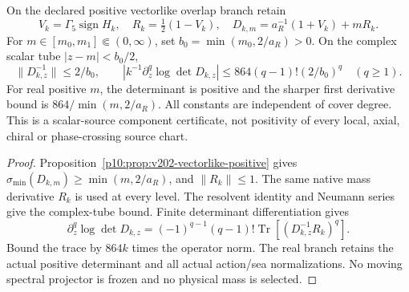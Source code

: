 \documentclass[12pt,a4paper]{article}
\begin{document}
\begin{proposition}
\label{p10:prop:v2189-native-clock-massive-tube}
On the declared positive vectorlike overlap branch retain
\[
 V_k=\Gamma_5\operatorname{sign}H_k,\quad
 R_k=\tfrac12(1-V_k),\quad
 D_{k,m}=a_R^{-1}(1+V_k)+mR_k.
\]
For $m\in[m_0,m_1]\Subset(0,\infty)$, set
$b_0=\min(m_0,2/a_R)>0$. On the complex scalar tube
$|z-m|<b_0/2$,
\[
 \|D_{k,z}^{-1}\|\le2/b_0,\qquad
 \left|k^{-1}\partial_z^q\log\det D_{k,z}\right|
 \le864(q-1)!(2/b_0)^q\quad(q\ge1).
\]
For real positive $m$, the determinant is positive and the sharper first
derivative bound is $864/\min(m,2/a_R)$. All constants are independent
of cover degree. This is a scalar-source component certificate, not
positivity of every local, axial, chiral or phase-crossing source chart.
\end{proposition}
\begin{proof}
Proposition~\ref{p10:prop:v202-vectorlike-positive} gives
$\sigma_{\min}(D_{k,m})\ge\min(m,2/a_R)$, and $\|R_k\|\le1$.
The same native mass derivative $R_k$ is used at every level.
The resolvent identity and Neumann series give the complex-tube bound.
Finite determinant differentiation gives
\[
 \partial_z^q\log\det D_{k,z}
 =(-1)^{q-1}(q-1)!\operatorname{Tr}
                 [(D_{k,z}^{-1}R_k)^q].
\]
Bound the trace by $864k$ times the operator norm. The real branch retains
the actual positive determinant and all actual action/sea normalizations.
No moving spectral projector is frozen and no physical mass is selected.
\end{proof}
\end{document}
